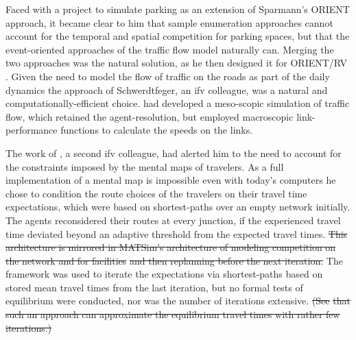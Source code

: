 Faced with a project to simulate parking as an extension of Sparmann's ORIENT approach, it became clear to him that sample enumeration approaches cannot account for the temporal and spatial competition for parking spaces, but that the event-oriented approaches of the traffic flow model naturally can. 
Merging the two approaches was the natural solution, as he then designed it for ORIENT/RV \citep[][]{Axhausen_TechRep_IFV_1989}. 
Given the need to model the flow of traffic on the roads as part of the daily dynamics the approach of Schwerdtfeger, an \gls{ifv} colleague, was a natural and computationally-efficient choice. 
\citet[][]{Schwerdtfeger_VolmulerHamerslag_1984} had developed a meso-scopic simulation of traffic flow, which retained the agent-resolution, but employed macroscopic link-performance functions to calculate the speeds on the links. 

The work of \citet[][]{Swiderski_CarpenterJones_1983}, a second \gls{ifv} colleague, had alerted him to the need to account for the constraints imposed by the mental maps of travelers. As a full implementation of a mental map is impossible even with today's computers he chose to condition the route choices of the travelers on their travel time expectations, which were based on shortest-paths over an empty network initially. The agents reconsidered their routes at every junction, if the experienced travel time deviated beyond an adaptive threshold from the expected travel times. 
%
\st{This architecture is mirrored in MATSim's architecture of modeling competition  on the network and for facilities} \textcolor{gray}{\tiny \citep[][]{HorniEtAl_TRR_2009}} \st{and then replanning before the next iteration.} 
The framework was used to iterate \citep[][]{Axhausen_Jones_1990} the expectations via shortest-paths based on stored mean travel times from the last iteration, but no formal tests of equilibrium were conducted, nor was the number of iterations extensive. \st{(See} \textcolor{gray}{\tiny \citet[][]{Dobler_PhDThesis_2013}} \st{that such an approach can approximate the equilibrium travel times with rather few iterations.)}

